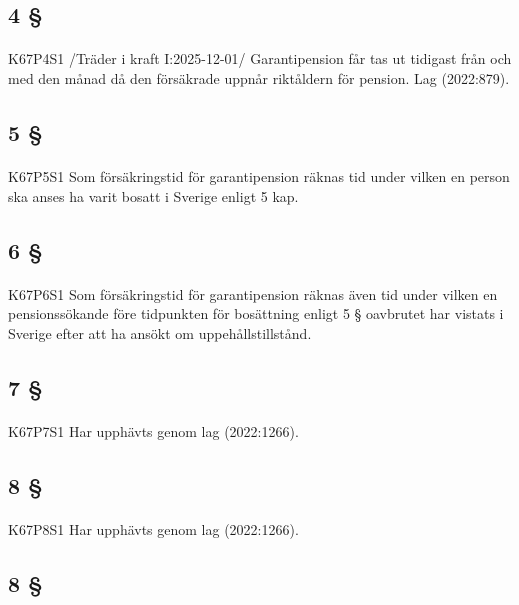 \documentclass[a4paper,notitlepage,openany,10pt]{book}
\begin{document}
\subsection*{4 §}
\paragraph*{}
{\tiny K67P4S1}
/Träder i kraft I:2025-12-01/
Garantipension får tas ut tidigast från och med den månad då den försäkrade uppnår riktåldern för pension.
Lag (2022:879).
\subsection*{5 §}
\paragraph*{}
{\tiny K67P5S1}
Som försäkringstid för garantipension räknas tid under vilken en person ska anses ha varit bosatt i Sverige enligt 5 kap.
\subsection*{6 §}
\paragraph*{}
{\tiny K67P6S1}
Som försäkringstid för garantipension räknas även tid under vilken en pensionssökande före tidpunkten för bosättning enligt 5 § oavbrutet har vistats i Sverige efter att ha ansökt om uppehållstillstånd.
\subsection*{7 §}
\paragraph*{}
{\tiny K67P7S1}
Har upphävts genom
lag (2022:1266).
\subsection*{8 §}
\paragraph*{}
{\tiny K67P8S1}
Har upphävts genom
lag (2022:1266).
\subsection*{8 §}
\end{document}
